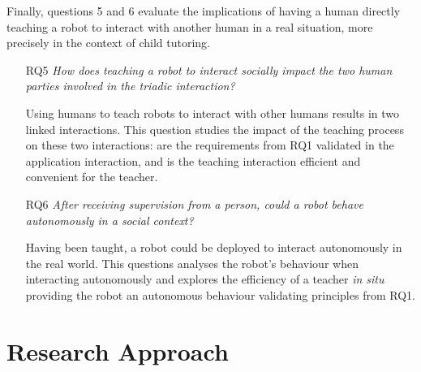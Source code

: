 Finally, questions 5 and 6 evaluate the implications of having a human directly teaching a robot to interact with another human in a real situation, more precisely in the context of child tutoring.
\begin{itemize}
	\item [RQ5] \emph{How does teaching a robot to interact socially impact the two human parties involved in the triadic interaction?}

		Using humans to teach robots to interact with other humans results in two linked interactions. This question studies the impact of the teaching process on these two interactions: are the requirements from RQ1 validated in the application interaction, and is the teaching interaction efficient and convenient for the teacher.
		
    \item [RQ6] \emph{After receiving supervision from a person, could a robot behave autonomously in a social context?}

	 	Having been taught, a robot could be deployed to interact autonomously in the real world. This questions analyses the robot's behaviour when interacting autonomously and explores the efficiency of a teacher \textit{in situ} providing the robot an autonomous behaviour validating principles from RQ1.
	 
\end{itemize}

\section{Research Approach}

